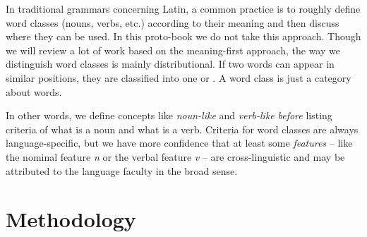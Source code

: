 \documentclass[../main.tex]{subfiles}
\begin{document}
In traditional grammars concerning Latin, a common practice is to roughly define word classes (nouns, verbs, etc.) 
according to their meaning and then discuss where they can be used. 
In this proto-book we do not take this approach. Though we will review a lot of work based on the meaning-first 
approach, the way we distinguish word classes is mainly distributional. If two words can appear in similar
positions, they are classified into one  or .
A word class is just a category about words.  

In other words, we define concepts like \emph{noun-like} and \emph{verb-like} \emph{before} listing criteria of 
what is a noun and what is a verb. Criteria for word classes are always language-specific, but we have more 
confidence that at least some \emph{features} -- like the nominal feature \textit{n} or the verbal feature 
\textit{v} -- are cross-linguistic and may be attributed to the language faculty in the broad sense. 

\section{Methodology}

\end{document}
